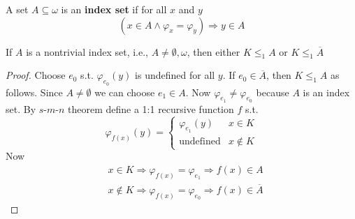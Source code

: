 \documentclass[11pt]{article}
\begin{document}
\begin{definition}[]
A set \(A\subseteq\omega\) is an \textbf{index set} if for all \(x\) and \(y\)
\begin{equation*}
(x\in A\wedge\varphi_x=\varphi_y)\Longrightarrow y\in  A
\end{equation*}
\end{definition}

\begin{theorem}[]
If \(A\) is a nontrivial index set, i.e., \(A\neq \emptyset,\omega\), then either
\(K\le_1 A\) or \(K\le_1\overline{A}\)
\end{theorem}

\begin{proof}
Choose \(e_0\) s.t. \(\varphi_{e_0}(y)\) is undefined for all \(y\). If
\(e_0\in\overline{A}\), then \(K\le_1 A\) as follows. Since \(A\neq\emptyset\) we can
choose \(e_1\in A\). Now \(\varphi_{e_1}\neq\varphi_{e_0}\) because \(A\) is an
index set. By \(s\)-\(m\)-\(n\) theorem define a 1:1 recursive function \(f\)
s.t.
\begin{equation*}
\varphi_{f(x)}(y)=
\begin{cases}
\varphi_{e_1}(y)&x\in K\\
\text{undefined}&x\not\in K
\end{cases}
\end{equation*}
Now
\begin{align*}
&x\in K\Longrightarrow\varphi_{f(x)}=\varphi_{e_1}\Longrightarrow f(x)\in A\\
&x\not\in K\Longrightarrow\varphi_{f(x)}=\varphi_{e_0}\Longrightarrow
f(x)\in\overline{A}
\end{align*}
\end{proof}
\end{document}
